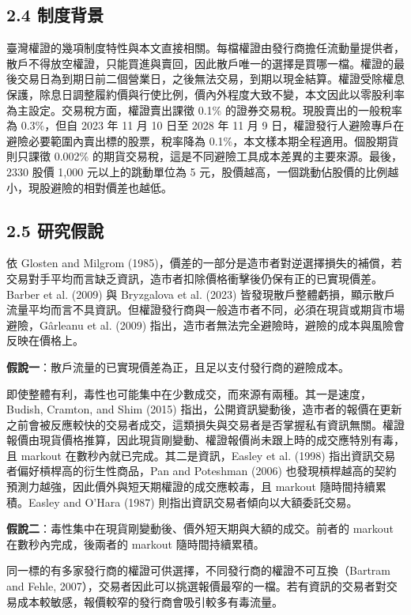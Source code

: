 \documentclass[12pt,a4paper]{article}
\begin{document}
\subsection*{2.4 制度背景}

臺灣權證的幾項制度特性與本文直接相關。每檔權證由發行商擔任流動量提供者，散戶不得放空權證，只能買進與賣回，因此散戶唯一的選擇是買哪一檔。權證的最後交易日為到期日前二個營業日，之後無法交易，到期以現金結算。權證受除權息保護，除息日調整履約價與行使比例，價內外程度大致不變，本文因此以零股利率為主設定。交易稅方面，權證賣出課徵 0.1\% 的證券交易稅。現股賣出的一般稅率為 0.3\%，但自 2023 年 11 月 10 日至 2028 年 11 月 9 日，權證發行人避險專戶在避險必要範圍內賣出標的股票，稅率降為 0.1\%，本文樣本期全程適用。個股期貨則只課徵 0.002\% 的期貨交易稅，這是不同避險工具成本差異的主要來源。最後，2330 股價 1,000 元以上的跳動單位為 5 元，股價越高，一個跳動佔股價的比例越小，現股避險的相對價差也越低。

\subsection*{2.5 研究假說}

依 Glosten and Milgrom (1985)，價差的一部分是造市者對逆選擇損失的補償，若交易對手平均而言缺乏資訊，造市者扣除價格衝擊後仍保有正的已實現價差。Barber et al. (2009) 與 Bryzgalova et al. (2023) 皆發現散戶整體虧損，顯示散戶流量平均而言不具資訊。但權證發行商與一般造市者不同，必須在現貨或期貨市場避險，Gârleanu et al. (2009) 指出，造市者無法完全避險時，避險的成本與風險會反映在價格上。

\textbf{假說一}：散戶流量的已實現價差為正，且足以支付發行商的避險成本。

即使整體有利，毒性也可能集中在少數成交，而來源有兩種。其一是速度，Budish, Cramton, and Shim (2015) 指出，公開資訊變動後，造市者的報價在更新之前會被反應較快的交易者成交，這類損失與交易者是否掌握私有資訊無關。權證報價由現貨價格推算，因此現貨剛變動、權證報價尚未跟上時的成交應特別有毒，且 markout 在數秒內就已完成。其二是資訊，Easley et al. (1998) 指出資訊交易者偏好槓桿高的衍生性商品，Pan and Poteshman (2006) 也發現槓桿越高的契約預測力越強，因此價外與短天期權證的成交應較毒，且 markout 隨時間持續累積。Easley and O'Hara (1987) 則指出資訊交易者傾向以大額委託交易。

\textbf{假說二}：毒性集中在現貨剛變動後、價外短天期與大額的成交。前者的 markout 在數秒內完成，後兩者的 markout 隨時間持續累積。

同一標的有多家發行商的權證可供選擇，不同發行商的權證不可互換（Bartram and Fehle, 2007），交易者因此可以挑選報價最窄的一檔。若有資訊的交易者對交易成本較敏感，報價較窄的發行商會吸引較多有毒流量。
\end{document}
